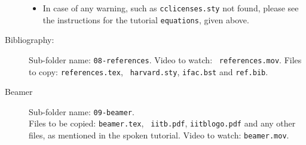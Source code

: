 \documentclass[11pt]{article}
\begin{document}
\begin{multicols}{2}
\begin{description}
\begin{itemize}
\item In case of any warning, such as {\tt cclicenses.sty} not found,
  please see the instructions for the tutorial {\tt equations}, given
  above.
\end{itemize}
\item [Bibliography:] 
Sub-folder name: {\tt 08-references}.  Video to watch: {\tt
  references.mov}.  
Files to copy: {\tt references.tex}, {\tt
  harvard.sty}, {\tt ifac.bst} and {\tt ref.bib}.
\item [Beamer]
Sub-folder name: {\tt 09-beamer}. \\
Files to be copied: {\tt beamer.tex}, {\tt
  iitb.pdf}, {\tt iitblogo.pdf} and any other files, as mentioned in
the spoken tutorial.  Video to watch: {\tt beamer.mov}.
\end{description}
\end{multicols}
\end{document}
